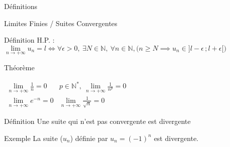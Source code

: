 \documentclass{cours}
\begin{document}
\begin{Gpartie}{Définitions}
\begin{Spartie}{Limites Finies / Suites Convergentes}
\begin{SSpartie}{Définition}
                H.P. : $\lim\limits_{n\to +\infty} u_n=l\iff\forall\epsilon >0,\ \exists N\in\mathbb{N},\ \forall n\in\mathbb{N}, \Big(n\geq N\implies u_n\in\big]l-\epsilon\,;l+\epsilon\big[\Big)$
            \end{SSpartie}
            \begin{SSpartie}{Théorème} 
                \begin{center}$\begin{array}{cc}
                    \lim\limits_{n\to +\infty}\frac{1}{n}=0 & p\in\mathbb{N^*},\ \lim\limits_{n\to +\infty}\frac{1}{n^p}=0 \\
                    \lim\limits_{n\to +\infty}e^{-n}=0 & \lim\limits_{n\to +\infty}\frac{1}{\sqrt{n}}=0
                \end{array}$\end{center}
            \end{SSpartie}
            \begin{SSpartie}{Définition} 
                Une suite qui n'est pas convergente est divergente
            \end{SSpartie}
            \begin{SSpartie}{Exemple} 
                La suite ($u_n$) définie par $u_n=(-1)^n$ est divergente.
            \end{SSpartie}
        \end{Spartie}
    \end{Gpartie}
    \pagebreak
\end{document}
